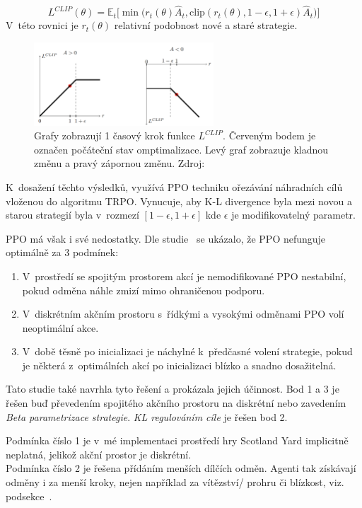 \begin{equation}
  L^{CLIP}(\theta) = \mathbb{E}_t \Big[ \min \Big( r_t(\theta) \hat{A}_t, \text{clip}(r_t(\theta), 1-\epsilon, 1+\epsilon) \hat{A}_t \Big) \Big]
\end{equation}
V~této rovnici je $r_t(\theta)$ relativní podobnost nové a staré strategie.

\begin{figure}[H]
	\centering
	\includegraphics[width=0.6\textwidth]{obrazky-figures/clip}
	\caption{Grafy zobrazují 1 časový krok funkce $L^{CLIP}$. Červeným bodem je označen počáteční stav omptimalizace. Levý graf zobrazuje kladnou změnu a pravý zápornou změnu.
  Zdroj: \cite{RL_basics}}\label{fig:clip}
\end{figure}

K~dosažení těchto výsledků, využívá PPO techniku ořezávání náhradních cílů vloženou do algoritmu TRPO\@.
Vynucuje, aby K-L divergence byla mezi novou a starou strategií byla v~rozmezí $[1-\epsilon, 1+\epsilon]$ kde $\epsilon$ je modifikovatelný parametr.

PPO má však i své nedostatky.
\label{PPO_weakness}
Dle studie~\cite{PPO_weakness} se ukázalo, že PPO nefunguje optimálně za 3 podmínek:
\begin{enumerate}
  \item V~prostředí se spojitým prostorem akcí je nemodifikované PPO nestabilní, pokud odměna náhle zmizí mimo ohraničenou podporu.
  \item V~diskrétním akčním prostoru s~řídkými a vysokými odměnami PPO volí neoptimální akce.
  \item V~době těsně po inicializaci je náchylné k~předčasné volení strategie, pokud je některá z~optimálních akcí po inicializaci blízko a snadno dosažitelná.
\end{enumerate}

Tato studie také navrhla tyto řešení a prokázala jejich účinnost.
Bod 1 a 3 je řešen buď převedením spojitého akčního prostoru na diskrétní nebo zavedením \emph{Beta parametrizace strategie}.
\emph{KL regulováním cíle} je řešen bod 2.

Podmínka číslo 1 je v~mé implementaci prostředí hry Scotland Yard implicitně neplatná, jelikož akční prostor je diskrétní.\\
Podmínka číslo 2 je řešena přídáním menších dílčích odměn.
Agenti tak získávají odměny i za menší kroky, nejen například za vítězství/ prohru či blízkost, viz. podsekce~.\\
